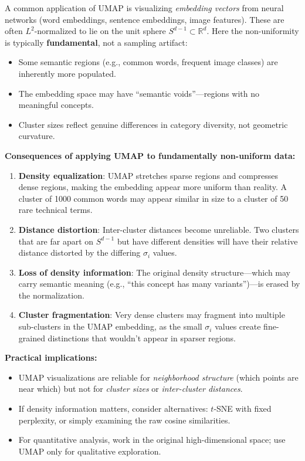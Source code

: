 \begin{remark}\label{rem:umap-sphere}
  A common application of UMAP is visualizing \emph{embedding vectors} from neural networks (word embeddings, sentence embeddings, image features). These are often $L^2$-normalized to lie on the unit sphere $S^{d-1} \subset \mathbb{R}^d$. Here the non-uniformity is typically \textbf{fundamental}, not a sampling artifact:
  \begin{itemize}
    \item Some semantic regions (e.g., common words, frequent image classes) are inherently more populated.
    \item The embedding space may have ``semantic voids''---regions with no meaningful concepts.
    \item Cluster sizes reflect genuine differences in category diversity, not geometric curvature.
  \end{itemize}

  \textbf{Consequences of applying UMAP to fundamentally non-uniform data:}
  \begin{enumerate}
    \item \textbf{Density equalization}: UMAP stretches sparse regions and compresses dense regions, making the embedding appear more uniform than reality. A cluster of 1000 common words may appear similar in size to a cluster of 50 rare technical terms.

    \item \textbf{Distance distortion}: Inter-cluster distances become unreliable. Two clusters that are far apart on $S^{d-1}$ but have different densities will have their relative distance distorted by the differing $\sigma_i$ values.

    \item \textbf{Loss of density information}: The original density structure---which may carry semantic meaning (e.g., ``this concept has many variants'')---is erased by the normalization.

    \item \textbf{Cluster fragmentation}: Very dense clusters may fragment into multiple sub-clusters in the UMAP embedding, as the small $\sigma_i$ values create fine-grained distinctions that wouldn't appear in sparser regions.
  \end{enumerate}

  \textbf{Practical implications:}
  \begin{itemize}
    \item UMAP visualizations are reliable for \emph{neighborhood structure} (which points are near which) but not for \emph{cluster sizes} or \emph{inter-cluster distances}.
    \item If density information matters, consider alternatives: $t$-SNE with fixed perplexity, or simply examining the raw cosine similarities.
    \item For quantitative analysis, work in the original high-dimensional space; use UMAP only for qualitative exploration.
  \end{itemize}
\end{remark}


